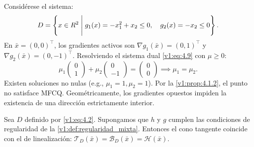 \begin{example}\label{v1:exa:dual_mfcq}
 Considérese el sistema:
 \[
 D = \left\{ x \in R^2 \mathrel{\Bigg|} g_1(x) = -x_1^2 + x_2 \le 0, \quad g_2(x) = -x_2 \le 0 \right\}.
 \]
 En $\bar{x} = (0,0)^\top$, los gradientes activos son $\nabla g_1(\bar{x}) = (0, 1)^\top$ y $\nabla g_2(\bar{x}) = (0, -1)^\top$. Resolviendo el sistema dual \eqref{v1:eq:4.9} con $\mu \ge 0$:
 \[
 \mu_1 \begin{pmatrix} 0 \\ 1 \end{pmatrix} + \mu_2 \begin{pmatrix} 0 \\ -1 \end{pmatrix} = \begin{pmatrix} 0 \\ 0 \end{pmatrix} \implies \mu_1 = \mu_2.
 \]
 Existen soluciones no nulas (e.g., $\mu_1 = 1, \mu_2 = 1$). Por la \cref{v1:prop:4.1.2}, el punto no satisface MFCQ. Geométricamente, los gradientes opuestos impiden la existencia de una dirección estrictamente interior.
\end{example}

\begin{theorem}\label{v1:thm:4.1.2}
 Sea $D$ definido por \eqref{v1:eq:4.2}. Supongamos que $h$ y $g$ cumplen las condiciones de regularidad de la \cref{v1:def:regularidad_mixta}. Entonces el cono tangente coincide con el de linealización: $\mathcal{T}_D(\bar{x}) = \mathcal{B}_D(\bar{x}) = \mathcal{H}(\bar{x})$.
\end{theorem}
